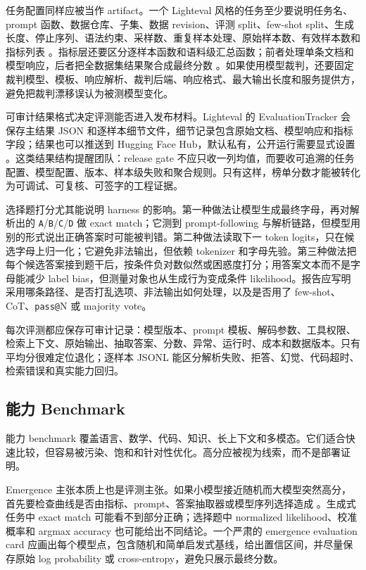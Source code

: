 \documentclass[UTF8,zihao=-4,openany]{ctexbook}
\begin{document}
任务配置同样应被当作 artifact。一个 Lighteval 风格的任务至少要说明任务名、prompt 函数、数据仓库、子集、数据 revision、评测 split、few-shot split、生成长度、停止序列、语法约束、采样数、重复样本处理、原始样本数、有效样本数和指标列表 \cite{huggingface2026lightevaltasks}。指标层还要区分逐样本函数和语料级汇总函数；前者处理单条文档和模型响应，后者把全数据集结果聚合成最终分数 \cite{huggingface2026lightevalmetrics}。如果使用模型裁判，还要固定裁判模型、模板、响应解析、裁判后端、响应格式、最大输出长度和服务提供方，避免把裁判漂移误认为被测模型变化。

可审计结果格式决定评测能否进入发布材料。Lighteval 的 EvaluationTracker 会保存主结果 JSON 和逐样本细节文件，细节记录包含原始文档、模型响应和指标字段；结果也可以推送到 Hugging Face Hub，默认私有，公开运行需要显式设置 \cite{huggingface2026lightevalresults}。这类结果结构提醒团队：release gate 不应只收一列均值，而要收可追溯的任务配置、模型配置、版本、样本级失败和聚合规则。只有这样，榜单分数才能被转化为可调试、可复核、可签字的工程证据。

选择题打分尤其能说明 harness 的影响。第一种做法让模型生成最终字母，再对解析出的 \texttt{A}/\texttt{B}/\texttt{C}/\texttt{D} 做 exact match；它测到 prompt-following 与解析链路，但模型用别的形式说出正确答案时可能被判错。第二种做法读取下一 token logits，只在候选字母上归一化；它避免非法输出，但依赖 tokenizer 和字母先验。第三种做法把每个候选答案接到题干后，按条件负对数似然或困惑度打分；用答案文本而不是字母能减少 label bias，但测量对象也从生成行为变成条件 likelihood。报告应写明采用哪条路径、是否打乱选项、非法输出如何处理，以及是否用了 few-shot、CoT、\texttt{pass@}N 或 majority vote。

每次评测都应保存可审计记录：模型版本、prompt 模板、解码参数、工具权限、检索上下文、原始输出、抽取答案、分数、异常、运行时、成本和数据版本。只有平均分很难定位退化；逐样本 JSONL 能区分解析失败、拒答、幻觉、代码超时、检索错误和真实能力回归。

\subsection{能力 Benchmark}
能力 benchmark 覆盖语言、数学、代码、知识、长上下文和多模态。它们适合快速比较，但容易被污染、饱和和针对性优化。高分应被视为线索，而不是部署证明。

Emergence 主张本质上也是评测主张。如果小模型接近随机而大模型突然高分，首先要检查曲线是否由指标、prompt、答案抽取器或模型序列选择造成 \cite{wei2022emergent}。生成式任务中 exact match 可能看不到部分正确；选择题中 normalized likelihood、校准概率和 argmax accuracy 也可能给出不同结论。一个严肃的 emergence evaluation card 应画出每个模型点，包含随机和简单启发式基线，给出置信区间，并尽量保存原始 log probability 或 cross-entropy，避免只展示最终分数。
\end{document}
